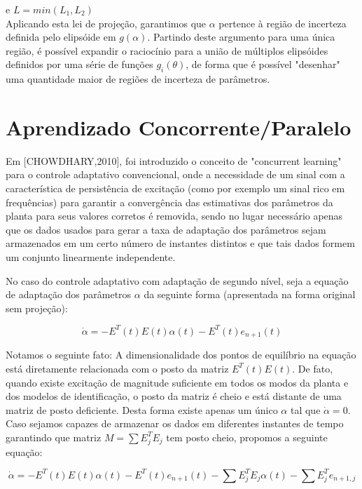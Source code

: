 \documentclass[11pt]{report}
\begin{document}
e $L = min(L_1, L_2)$\\

Aplicando esta lei de projeção, garantimos que $\alpha$ pertence à região de incerteza definida pelo elipsóide em $g(\alpha)$. Partindo deste argumento para uma única região, é possível expandir o raciocínio para a união de múltiplos elipsóides definidos por uma série de funções $g_i(\theta)$, de forma que é possível "desenhar" uma quantidade maior de regiões de incerteza de parâmetros.  

\section{Aprendizado Concorrente/Paralelo}

Em [CHOWDHARY,2010], foi introduzido o conceito de "concurrent learning" para o controle adaptativo convencional, onde a necessidade de um sinal com a característica de persistência de excitação (como por exemplo um sinal rico em frequências) para garantir a convergência das estimativas dos parâmetros da planta para seus valores corretos é removida, sendo no lugar necessário apenas que os dados usados para gerar a taxa de adaptação dos parâmetros sejam armazenados em um certo número de instantes distintos e que tais dados formem um conjunto linearmente independente.

No caso do controle adaptativo com adaptação de segundo nível, seja a equação de adaptação dos parâmetros $\alpha$ da seguinte forma (apresentada na forma original sem projeção):

\begin{equation}
\dot{\alpha} = -E^T(t)E(t)\alpha(t) - E^T(t)e_{n+1}(t)
\end{equation}

Notamos o seguinte fato: A dimensionalidade dos pontos de equilíbrio na equação está diretamente relacionada com o posto da matriz $E^T(t)E(t)$. De fato, quando existe excitação de magnitude suficiente em todos os modos da planta e dos modelos de identificação, o posto da matriz é cheio e está distante de uma matriz de posto deficiente. Desta forma existe apenas um único $\alpha$ tal que $\dot{\alpha}=0$. Caso sejamos capazes de armazenar os dados em diferentes instantes de tempo garantindo que matriz $M = \sum E_j^TE_j$ tem posto cheio, propomos a seguinte equação:

\begin{equation}
\dot{\alpha} = -E^T(t)E(t)\alpha(t) - E^T(t)e_{n+1}(t) -\sum E_j^TE_j\alpha(t) -\sum E_j^Te_{n+1,j}
\end{equation}
\end{document}
